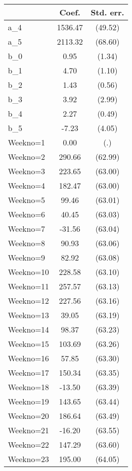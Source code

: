 {
\def\sym#1{\ifmmode^{#1}\else\(^{#1}\)\fi}
\begin{tabular}{l*{1}{cc}}
\hline\hline
                &    Coef.&Std. err.\\
\hline
a\_4             &  1536.47&  (49.52)\\
a\_5             &  2113.32&  (68.60)\\
b\_0             &     0.95&   (1.34)\\
b\_1             &     4.70&   (1.10)\\
b\_2             &     1.43&   (0.56)\\
b\_3             &     3.92&   (2.99)\\
b\_4             &     2.27&   (0.49)\\
b\_5             &    -7.23&   (4.05)\\
Weekno=1        &     0.00&      (.)\\
Weekno=2        &   290.66&  (62.99)\\
Weekno=3        &   223.65&  (63.00)\\
Weekno=4        &   182.47&  (63.00)\\
Weekno=5        &    99.46&  (63.01)\\
Weekno=6        &    40.45&  (63.03)\\
Weekno=7        &   -31.56&  (63.04)\\
Weekno=8        &    90.93&  (63.06)\\
Weekno=9        &    82.92&  (63.08)\\
Weekno=10       &   228.58&  (63.10)\\
Weekno=11       &   257.57&  (63.13)\\
Weekno=12       &   227.56&  (63.16)\\
Weekno=13       &    39.05&  (63.19)\\
Weekno=14       &    98.37&  (63.23)\\
Weekno=15       &   103.69&  (63.26)\\
Weekno=16       &    57.85&  (63.30)\\
Weekno=17       &   150.34&  (63.35)\\
Weekno=18       &   -13.50&  (63.39)\\
Weekno=19       &   143.65&  (63.44)\\
Weekno=20       &   186.64&  (63.49)\\
Weekno=21       &   -16.20&  (63.55)\\
Weekno=22       &   147.29&  (63.60)\\
Weekno=23       &   195.00&  (64.05)\\

\end{tabular}}
